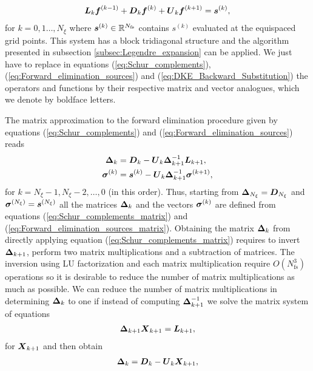 \begin{align}
	\vb*{L}_k  \vb*{f}^{(k-1)} + \vb*{D}_k  \vb*{f}^{(k)} + \vb*{U}_k   \vb*{f}^{(k+1)} = \vb*{s}^{(k)},   \label{eq:DKE_Legendre_expansion_Fourier_collocation}
\end{align}
for $k=0,1\ldots, N_\xi$ where $\vb*{s}^{(k)}\in\mathbb{R}^{N_{\text{fs}}}$
contains $s^{(k)}$ evaluated at the equispaced grid points. This system has a block tridiagonal structure and the algorithm presented in subsection \ref{subsec:Legendre_expansion} can be applied. We just have to replace in equations (\ref{eq:Schur_complements}), (\ref{eq:Forward_elimination_sources}) and (\ref{eq:DKE_Backward_Substitution}) the operators and functions by their respective matrix and vector analogues, which we denote by boldface letters. 

The matrix approximation to the forward elimination procedure given by equations (\ref{eq:Schur_complements}) and (\ref{eq:Forward_elimination_sources}) reads
\begin{align}
	\vb*{\Delta}_k & = \vb*{D}_k - \vb*{U}_{k} \vb*{\Delta}_{k+1}^{-1} \vb*{L}_{k+1}, 
	\label{eq:Schur_complements_matrix}
	\\
	\vb*{\sigma}^{(k)} & = \vb*{s}^{(k)} - \vb*{U}_{k}  \vb*{\Delta}_{k+1}^{-1}    \vb*{\sigma}^{(k+1)},
	\label{eq:Forward_elimination_sources_matrix}
\end{align}
for $k=N_\xi-1, N_\xi-2, \ldots, 0$ (in this order). Thus, starting from $\vb*{\Delta}_{N_\xi}=\vb*{D}_{N_\xi}$ and $\vb*{\sigma}^{(N_\xi)}=\vb*{s}^{(N_\xi)}$ all the matrices $\vb*{\Delta}_k$ and the vectors $\vb*{\sigma}^{(k)}$ are defined from equations (\ref{eq:Schur_complements_matrix}) and (\ref{eq:Forward_elimination_sources_matrix}). Obtaining the matrix $\vb*{\Delta}_k$ from directly applying equation (\ref{eq:Schur_complements_matrix}) requires to invert $\vb*{\Delta}_{k+1}$, perform two matrix multiplications and a subtraction of matrices. The inversion using LU factorization and each matrix multiplication require $O(N_{\text{fs}}^3)$ operations so it is desirable to reduce the number of matrix multiplications as much as possible. We can reduce the number of matrix multiplications in determining $\vb*{\Delta}_{k}$ to one if instead of computing $\vb*{\Delta}_{k+1}^{-1}$ we solve the matrix system of equations
%
\begin{align}
	\vb*{\Delta}_{k+1} \vb*{X}_{k+1} = \vb*{L}_{k+1},
	\label{eq:Forward_elimination_X}  
\end{align}
for $\vb*{X}_{k+1}$ and then obtain 
%
\begin{align}
	\vb*{\Delta}_k = \vb*{D}_k - \vb*{U}_{k}\vb*{X}_{k+1}, 
	\label{eq:Schur_complements_Fourier_collocation}
\end{align}
